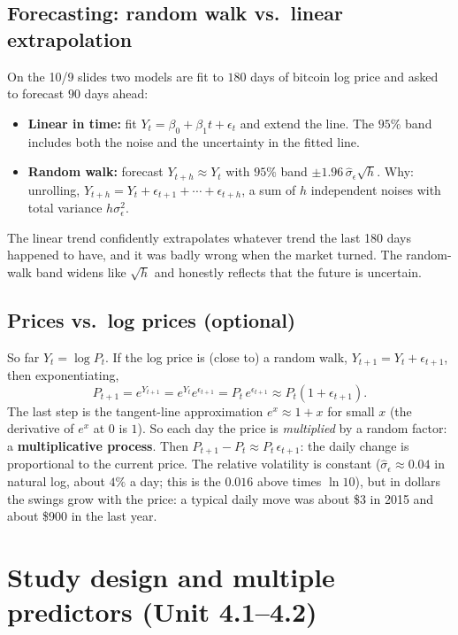 \documentclass[11pt]{article}
\begin{document}
\subsection{Forecasting: random walk vs.\ linear extrapolation}
On the 10/9 slides two models are fit to $180$ days of bitcoin log price and asked to forecast $90$ days ahead:
\begin{itemize}[leftmargin=*,itemsep=2pt]
\item \textbf{Linear in time:} fit $Y_t=\beta_0+\beta_1t+\epsilon_t$ and extend the line. The $95\%$ band includes both the noise and the
uncertainty in the fitted line.
\item \textbf{Random walk:} forecast $Y_{t+h}\approx Y_t$ with $95\%$ band $\pm1.96\,\hat\sigma_\epsilon\sqrt h$. Why: unrolling,
$Y_{t+h}=Y_t+\epsilon_{t+1}+\cdots+\epsilon_{t+h}$, a sum of $h$ independent noises with total variance $h\sigma_\epsilon^2$.
\end{itemize}
The linear trend confidently extrapolates whatever trend the last 180 days happened to have, and it was badly wrong when the market turned.
The random-walk band widens like $\sqrt h$ and honestly reflects that the future is uncertain.

\subsection{Prices vs.\ log prices (optional)}
So far $Y_t=\log P_t$. If the log price is (close to) a random walk, $Y_{t+1}=Y_t+\epsilon_{t+1}$, then exponentiating,
\[
P_{t+1}=e^{Y_{t+1}}=e^{Y_t}e^{\epsilon_{t+1}}=P_t\,e^{\epsilon_{t+1}}\approx P_t(1+\epsilon_{t+1}).
\]
The last step is the tangent-line approximation $e^x\approx1+x$ for small $x$ (the derivative of $e^x$ at $0$ is $1$). So each day the
price is \emph{multiplied} by a random factor: a \textbf{multiplicative process}. Then $P_{t+1}-P_t\approx P_t\,\epsilon_{t+1}$: the daily
change is proportional to the current price. The relative volatility is constant ($\hat\sigma_\epsilon\approx0.04$ in natural log, about
$4\%$ a day; this is the $0.016$ above times $\ln10$), but in dollars the swings grow with the price: a typical daily move was about \$3 in
2015 and about \$900 in the last year.

\section{Study design and multiple predictors (Unit 4.1--4.2)}\label{sec:mult}
\end{document}
